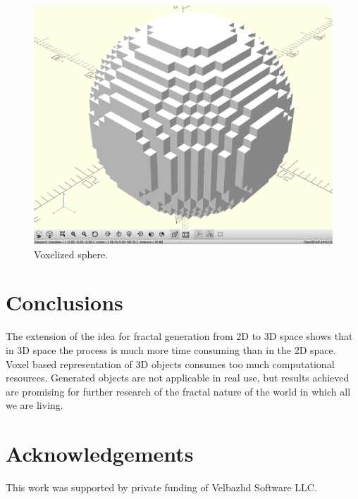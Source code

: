 \documentclass{llncs}
\begin{document}
\begin{figure}[h]
  \centering
  \includegraphics[width=1.0\linewidth]{pic02}
  \caption{Voxelized sphere.}
\label{fig:pic02}
\end{figure}
\FloatBarrier

\section{Conclusions} \label{Conclusions}

The extension of the idea for fractal generation from 2D to 3D space shows that in 3D space the process is much more time consuming than in the 2D space. Voxel based representation of 3D objects consumes too much computational resources. Generated objects are not applicable in real use, but results achieved are promising for further research of the fractal nature of the world in which all we are living. 

\section*{Acknowledgements}
This work was supported by private funding of Velbazhd Software LLC.
\end{document}
